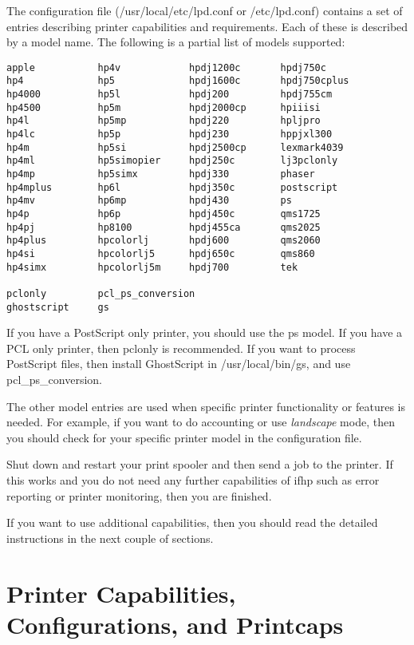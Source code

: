 \documentclass[a4paper]{article}
\begin{document}
The configuration file
({\ttfamily /usr/local/etc/lpd.conf}
or
{\ttfamily /etc/lpd.conf})
contains a set of entries describing printer
capabilities and requirements.
Each of these is described by a model name.
The following is a partial list of models supported:
\begin{tscreen}
\begin{verbatim}
apple           hp4v            hpdj1200c       hpdj750c
hp4             hp5             hpdj1600c       hpdj750cplus
hp4000          hp5l            hpdj200         hpdj755cm
hp4500          hp5m            hpdj2000cp      hpiiisi
hp4l            hp5mp           hpdj220         hpljpro
hp4lc           hp5p            hpdj230         hppjxl300
hp4m            hp5si           hpdj2500cp      lexmark4039
hp4ml           hp5simopier     hpdj250c        lj3pclonly
hp4mp           hp5simx         hpdj330         phaser
hp4mplus        hp6l            hpdj350c        postscript
hp4mv           hp6mp           hpdj430         ps
hp4p            hp6p            hpdj450c        qms1725
hp4pj           hp8100          hpdj455ca       qms2025
hp4plus         hpcolorlj       hpdj600         qms2060
hp4si           hpcolorlj5      hpdj650c        qms860
hp4simx         hpcolorlj5m     hpdj700         tek

pclonly         pcl_ps_conversion
ghostscript     gs
\end{verbatim}
\end{tscreen}


If you have a PostScript only printer,
you should use the {\ttfamily ps} model.
If you have a PCL only printer,
then {\ttfamily pclonly} is recommended.
If you want to process PostScript files,
then install GhostScript in {\ttfamily /usr/local/bin/gs},
and use {\ttfamily pcl\_ps\_conversion}.

The other model entries are used when specific printer
functionality or features is needed.
For example,
if you want to do accounting or use {\itshape landscape\/} mode,
then you should check for your specific printer model in the
configuration file.

Shut down and restart your print spooler and then send a job to the printer.
If this works and you do not need any further capabilities of {\ttfamily ifhp}
such as error reporting or printer monitoring,
then you are finished.

If you want to use additional capabilities,
then you should read the detailed instructions in the next couple of sections.


\section{Printer Capabilities, Configurations, and Printcaps}
\end{document}
